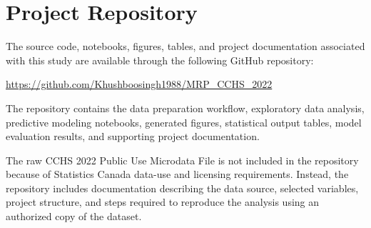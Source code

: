 \documentclass[12pt]{article}
\begin{document}
\section{Project Repository}

The source code, notebooks, figures, tables, and project documentation associated with this study are available through the following GitHub repository:

\begin{center}
\url{https://github.com/Khushboosingh1988/MRP_CCHS_2022}
\end{center}

The repository contains the data preparation workflow, exploratory data analysis, predictive modeling notebooks, generated figures, statistical output tables, model evaluation results, and supporting project documentation.

The raw CCHS 2022 Public Use Microdata File is not included in the repository because of Statistics Canada data-use and licensing requirements. Instead, the repository includes documentation describing the data source, selected variables, project structure, and steps required to reproduce the analysis using an authorized copy of the dataset.



\end{document}
